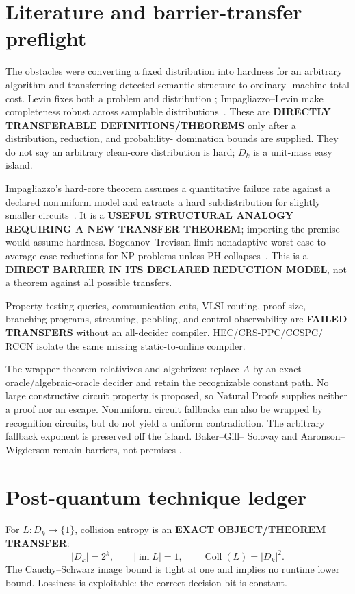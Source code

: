 \documentclass[11pt]{article}
\begin{document}
\section{Literature and barrier-transfer preflight}
The obstacles were converting a fixed distribution into hardness for an
arbitrary algorithm and transferring detected semantic structure to ordinary-
machine total cost. Levin fixes both a problem and distribution
\cite{Levin86}; Impagliazzo--Levin make completeness robust across samplable
distributions~\cite{IL90}. These are \textbf{DIRECTLY TRANSFERABLE
DEFINITIONS/THEOREMS} only after a distribution, reduction, and probability-
domination bounds are supplied. They do not say an arbitrary clean-core
distribution is hard; \(D_k\) is a unit-mass easy island.

Impagliazzo's hard-core theorem assumes a quantitative failure rate against a
declared nonuniform model and extracts a hard subdistribution for slightly
smaller circuits~\cite{Imp95}. It is a \textbf{USEFUL STRUCTURAL ANALOGY
REQUIRING A NEW TRANSFER THEOREM}; importing the premise would assume
hardness. Bogdanov--Trevisan limit nonadaptive worst-case-to-average-case
reductions for NP problems unless PH collapses~\cite{BT06}. This is a
\textbf{DIRECT BARRIER IN ITS DECLARED REDUCTION MODEL}, not a theorem against
all possible transfers.

Property-testing queries, communication cuts, VLSI routing, proof size,
branching programs, streaming, pebbling, and control observability are
\textbf{FAILED TRANSFERS} without an all-decider compiler. HEC/CRS-PPC/CCSPC/
RCCN isolate the same missing static-to-online compiler.

The wrapper theorem relativizes and algebrizes: replace \(A\) by an exact
oracle/algebraic-oracle decider and retain the recognizable constant path. No
large constructive circuit property is proposed, so Natural Proofs supplies
neither a proof nor an escape. Nonuniform circuit fallbacks can also be
wrapped by recognition circuits, but do not yield a uniform contradiction.
The arbitrary fallback exponent is preserved off the island. Baker--Gill--
Solovay and Aaronson--Wigderson remain barriers, not premises
\cite{BGS75,AW09}.

\section{Post-quantum technique ledger}
For \(L:D_k\to\{1\}\), collision entropy is an \textbf{EXACT OBJECT/THEOREM
TRANSFER}:
\[
 |D_k|=2^k,\qquad |\operatorname{im}L|=1,\qquad
 \operatorname{Coll}(L)=|D_k|^2.                         \tag{9}
\]
The Cauchy--Schwarz image bound is tight at one and implies no runtime lower
bound. Lossiness is exploitable: the correct decision bit is constant.
\end{document}

